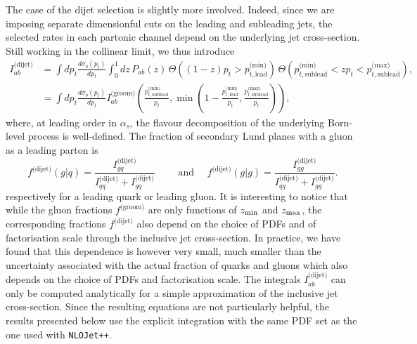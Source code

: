 \documentclass[a4paper,11pt]{article}
\newcommand{\zmin}{z_{\rm{min}}}
\newcommand{\zmax}{z_{\rm{max}}}
\begin{document}
The case of the dijet selection is slightly more involved. Indeed, since we are imposing separate dimensionful cuts on the leading and subleading jets, the selected rates in each partonic channel depend on the underlying jet cross-section. Still working in the collinear limit, we thus introduce
%
\begin{align}
\label{eq:int-Pab-dijet}
I^\text{(dijet)}_{ab} 
& = \int dp_t \frac{d\sigma_b(p_t)}{dp_t} \int_0^1 dz\, P_{ab}(z)
\,\Theta((1-z)p_t>p_{t,\text{lead}}^\text{(min)})
\,\Theta(p_{t,\text{sublead}}^\text{(min)}<zp_t<p_{t,\text{sublead}}^\text{(max)}),\nonumber\\
& = \int dp_t \frac{d\sigma_b(p_t)}{dp_t} I^\text{(groom)}_{ab}\left(\frac{p_{t,\text{sublead}}^\text{(min)}}{p_t},\min\left(1-\frac{p_{t,\text{lead}}^\text{(min)}}{p_t},\frac{p_{t,\text{sublead}}^\text{(max)}}{p_t}\right)\right),
\end{align}
%
where, at leading order in $\alpha_s$, the flavour decomposition of the underlying Born-level process is well-defined.
%
The fraction of secondary Lund planes with a gluon as a leading parton is 
%
\begin{equation}\label{eq:g-frac-collinear-dijet}
f^\text{(dijet)}(g|q) = \frac{I^\text{(dijet)}_{gq}}{I^\text{(dijet)}_{qq}+I^\text{(dijet)}_{gq}}
\qquad\text{ and }\quad
f^\text{(dijet)}(g|g) = \frac{I^\text{(dijet)}_{gg}}{I^\text{(dijet)}_{qg}+I^\text{(dijet)}_{gg}}.
\end{equation}
%
respectively for a leading quark or leading gluon.
%
It is interesting to notice that while the gluon fractions $f^\text{(groom)}$ are only functions of $\zmin$ and $\zmax$, the corresponding fractions  $f^\text{(dijet)}$ also depend on the choice of PDFs and of factorisation scale through the inclusive jet cross-section. 
%
In practice, we have found that this dependence is however very small, much smaller than the uncertainty associated with the actual fraction of quarks and gluons which also depends on the choice of PDFs and factorisation scale. 
%
The integrals $I^\text{(dijet)}_{ab}$ can only be computed analytically for a simple approximation of the inclusive jet cross-section. Since the resulting equations are not particularly helpful, the results presented below use the explicit integration with the same PDF set as the one used with \texttt{NLOJet++}.
\end{document}
